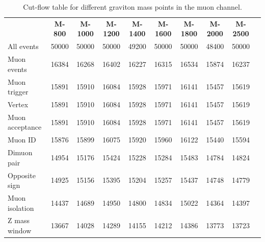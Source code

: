 \begin{landscape}
\begin{table}[p]
\begin{center}
\caption[Cut-flow table muon channel.]{Cut-flow table for different graviton mass points in the muon channel.}
\label{tab:cutFlowMu}
\begin{tabular}{lccccccccc}
\hline
                   &\textbf{M-800} &\textbf{M-1000} &\textbf{M-1200} &\textbf{M-1400} &\textbf{M-1600}  &\textbf{M-1800} &\textbf{M-2000} &\textbf{M-2500} \\ 
 All events        &   50000   &    50000  &    50000  &    49200  &    50000  &    50000  &    48400  &    50000  \\
 Muon events       &   16384   &    16268  &    16402  &    16227  &    16315  &    16534  &    15874  &    16237  \\
 Muon trigger      &   15891   &    15910  &    16084  &    15928  &    15971  &    16141  &    15457  &    15619  \\
 Vertex            &   15891   &    15910  &    16084  &    15928  &    15971  &    16141  &    15457  &    15619  \\
 Muon acceptance   &   15891   &    15910  &    16084  &    15928  &    15971  &    16141  &    15457  &    15619  \\
 Muon ID           &   15876   &    15899  &    16075  &    15920  &    15960  &    16122  &    15440  &    15594  \\
 Dimuon pair       &   14954   &    15176  &    15424  &    15228  &    15284  &    15483  &    14784  &    14824  \\
 Opposite sign     &   14925   &    15156  &    15395  &    15204  &    15257  &    15437  &    14748  &    14779  \\
 Muon isolation    &   14437   &    14689  &    14950  &    14800  &    14834  &    15022  &    14364  &    14397  \\
 Z mass window     &   13667   &    14028  &    14289  &    14155  &    14212  &    14386  &    13773  &    13723  \\

\end{tabular}
\end{center}
\end{table}
\end{landscape}
